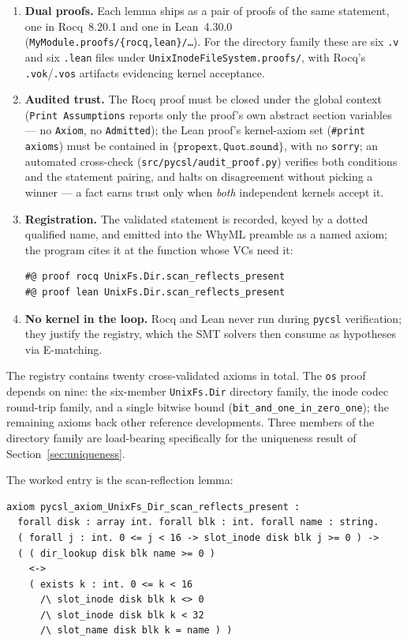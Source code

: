 \documentclass[11pt]{article}
\newcommand{\whyml}{\textsf{WhyML}}
\newcommand{\rocq}{\textsf{Rocq}}
\newcommand{\lean}{\textsf{Lean}}
\newcommand{\osmod}{\texttt{os}}
\begin{document}
\begin{enumerate}
\item \textbf{Dual proofs.} Each lemma ships as a pair of proofs of the same
  statement, one in \rocq{}~8.20.1 and one in \lean{}~4.30.0
  (\texttt{MyModule.proofs/\{rocq,lean\}/\ldots}). For the directory family
  these are six \texttt{.v} and six \texttt{.lean} files under
  \texttt{UnixInodeFileSystem.proofs/}, with \rocq{}'s \texttt{.vok}/\texttt{.vos}
  artifacts evidencing kernel acceptance.
\item \textbf{Audited trust.} The \rocq{} proof must be closed under the
  global context (\texttt{Print Assumptions} reports only the proof's own
  abstract section variables --- no \texttt{Axiom}, no \texttt{Admitted}); the
  \lean{} proof's kernel-axiom set (\texttt{\#print axioms}) must be contained
  in $\{\texttt{propext}, \texttt{Quot.sound}\}$, with no \texttt{sorry}; an
  automated cross-check (\texttt{src/pycsl/audit\_proof.py}) verifies both
  conditions and the statement pairing, and halts on disagreement without
  picking a winner --- a fact earns trust only when \emph{both} independent
  kernels accept it.
\item \textbf{Registration.} The validated statement is recorded, keyed by a
  dotted qualified name, and emitted into the \whyml{} preamble as a named
  axiom; the program cites it at the function whose VCs need it:
\begin{lstlisting}
#@ proof rocq UnixFs.Dir.scan_reflects_present
#@ proof lean UnixFs.Dir.scan_reflects_present
\end{lstlisting}
\item \textbf{No kernel in the loop.} \rocq{} and \lean{} never run during
  \texttt{pycsl} verification; they justify the registry, which the SMT
  solvers then consume as hypotheses via E-matching.
\end{enumerate}

The registry contains twenty cross-validated axioms in total. The \osmod{}
proof depends on nine: the six-member \texttt{UnixFs.Dir} directory family, the
inode codec round-trip family, and a single bitwise bound
(\texttt{bit\_and\_one\_in\_zero\_one}); the remaining axioms back other
reference developments. Three members of the directory family are load-bearing
specifically for the uniqueness result of Section~\ref{sec:uniqueness}.

The worked entry is the scan-reflection lemma:

\begin{lstlisting}
axiom pycsl_axiom_UnixFs_Dir_scan_reflects_present :
  forall disk : array int. forall blk : int. forall name : string.
  ( forall j : int. 0 <= j < 16 -> slot_inode disk blk j >= 0 ) ->
  ( ( dir_lookup disk blk name >= 0 )
    <->
    ( exists k : int. 0 <= k < 16
      /\ slot_inode disk blk k <> 0
      /\ slot_inode disk blk k < 32
      /\ slot_name disk blk k = name ) )
\end{lstlisting}
\end{document}
